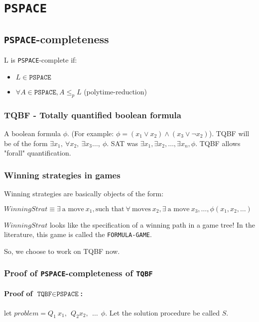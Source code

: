 \chapter{\texttt{PSPACE}}
\section{\texttt{PSPACE}-completeness}

L is \texttt{PSPACE}-complete if:
\begin{itemize}
    \item $L \in \texttt{PSPACE}$
    \item $\forall A \in \texttt{PSPACE}, A \leq_p L$ (polytime-reduction)
\end{itemize}

\subsection{TQBF - Totally quantified boolean formula}
A boolean formula $\phi$. (For example: $\phi = (x_1 \lor x_2) \land (x_3 \lor \lnot x_2)$).
TQBF will be of the form $\exists x_1,~\forall x_2,~\exists x_3 \dots,~\phi$.
SAT was $\exists x_1, \exists x_2, \dots, \exists x_n, \phi$. TQBF allows
"forall" quantification.

\subsection{Winning strategies in games}
Winning strategies are basically objects of the form:

$WinningStrat \equiv \exists~\text{a move}~x_1, \text{such that}~\forall~\text{moves}~x_2, \exists~\text{a move}~x_3, \dots, \phi(x_1, x_2, \dots)$

$WinningStrat$ looks like the specification of a winning path in a game tree!
In the literature, this game is called the \texttt{FORMULA-GAME}.

So, we choose to work on TQBF now.

\subsection{Proof of \texttt{PSPACE}-completeness of \texttt{TQBF}}
\subsubsection{Proof of $\texttt{TQBF} \in \texttt{PSPACE}$:}
let $problem = Q_1~x_1,~~Q_2x_2,~~\dots~~\phi$. Let the solution procedure
be called $S$.

